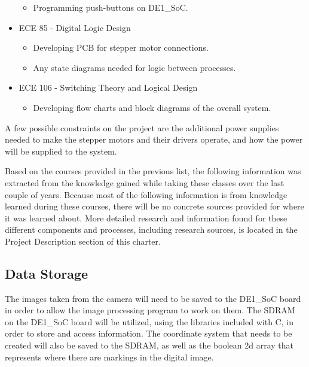 \begin{itemize}
\begin{itemize}
		\item Programming push-buttons on DE1\_SoC.
	\end{itemize}
	\item ECE 85 - Digital Logic Design
	\begin{itemize}
		\item Developing PCB for stepper motor connections.
		\item Any state diagrams needed for logic between processes.
	\end{itemize}
	\item ECE 106 - Switching Theory and Logical Design
	\begin{itemize}
		\item Developing flow charts and block diagrams of the overall system. \\
	\end{itemize}
\end{itemize}\par

A few possible constraints on the project are the additional power supplies needed to make the stepper motors and their drivers operate, and how the power will be supplied to the system.\par 
Based on the courses provided in the previous list, the following information was extracted from the knowledge gained while taking these classes over the last couple of years. Because most of the following information is from knowledge learned during these courses, there will be no concrete sources provided for where it was learned about. More detailed research and information found for these different components and processes, including research sources, is located in the Project Description section of this charter.

\subsection{Data Storage}
The images taken from the camera will need to be saved to the DE1\_SoC board in order to allow the image processing program to work on them. The SDRAM on the DE1\_SoC board will be utilized, using the libraries included with C, in order to store and access information. The coordinate system that needs to be created will also be saved to the SDRAM, as well as the boolean 2d array that represents where there are markings in the digital image.

